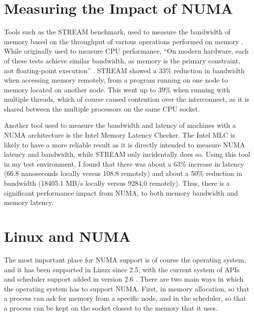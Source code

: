 \section{Measuring the Impact of NUMA}
\label{chapter:measuringnuma}
Tools such as the STREAM benchmark, used to measure the bandwidth of memory based on the throughput of various operations
performed on memory \cite{bergstrom_stream}.
While originally used to measure CPU performance, ``On modern hardware, each of these tests achieve similar bandwidth,
as memory is the primary constraint, not floating-point execution'' \cite{bergstrom_stream}.
STREAM showed a 33\% reduction in bandwidth when accessing memory remotely, from a program running on one node to memory located
on another node. This went up to 39\% when running with multiple threads, which of course caused contention over the interconnect,
as it is shared between the multiple processors on the same CPU socket.

Another tool used to measure the bandwidth and latency of machines with a NUMA architecture is the Intel Memory Latency Checker.
The Intel MLC is likely to have a more reliable result as it is directly intended to measure NUMA latency and bandwidth,
while STREAM only incidentally does so.
Using this tool in my test environment, I found that there was about a 63\% increase in latency
(66.8 nanoseconds locally versus 108.8 remotely) and about a 50\% reduction in bandwidth 
(18405.1 MB/s locally versus 9284.0 remotely).
Thus, there is a significant performance impact from NUMA, to both memory bandwidth and memory latency.

\section{Linux and NUMA}
The most important place for NUMA support is of course the operating system, and it has been supported in Linux since 2.5, with the current system
of APIs and scheduler support added in version 2.6 \cite{dobson_linux_numa}
\cite[{Documentation/admin-guide/mm/numa\_memory\_policy.rst}]{linux}.
There are two main ways in which the operating system has to support NUMA. First, in memory allocation, so that a process can ask for memory from
a specific node, and in the scheduler, so that a process can be kept on the socket closest to the memory that it uses.

